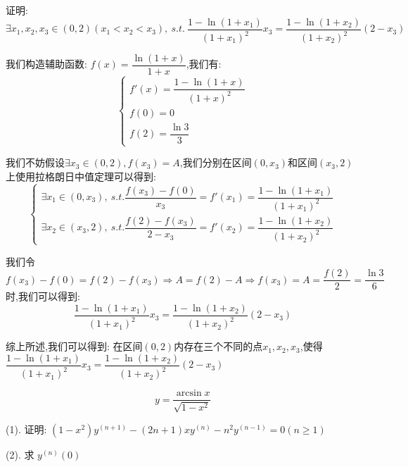\begin{example}[][Exam: 34.3.3]
	证明:
	$$\exists x_{1},x_{2},x_{3}\in(0,2)(x_{1} < x_{2} < x_{3}),\ s.t.\ 
	\dfrac{1-\ln(1+x_{1})}{(1+x_{1})^2}x_{3}=\dfrac{1-\ln(1+x_{2})}{(1+x_{2})^2}(2-x_{3})$$
\end{example}
\begin{solution}

	我们构造辅助函数:  $f(x)=\dfrac{\ln(1+x)}{1+x}$,我们有:  
	$$\left\lbrace 
	\begin{array}{l}
		f'(x)=\dfrac{1-\ln(1+x)}{(1+x)^2}\\
		f(0)=0\\
		f(2)=\dfrac{\ln 3}{3}
	\end{array}
	\right. $$
	
	我们不妨假设$\exists x_{3}\in(0,2), f(x_{3})=A$,我们分别在区间$(0,x_{3})$和区间$(x_{3},2)$上使用拉格朗日中值定理可以得到:  
	$$\left\lbrace 
	\begin{array}{l}
		\exists x_{1}\in(0,x_{3}),\ s.t. \dfrac{f(x_{3})-f(0)}{x_{3}}=f'(x_{1})=\dfrac{1-\ln(1+x_{1})}{(1+x_{1})^2}\\
		\exists x_{2}\in(x_{3},2),\ s.t. \dfrac{f(2)-f(x_{3})}{2-x_{3}}=f'(x_{2})=\dfrac{1-\ln(1+x_{2})}{(1+x_{2})^2}
	\end{array}
	\right. $$
	
	我们令$f(x_{3})-f(0)=f(2)-f(x_{3})\Rightarrow A=f(2)-A\Rightarrow f(x_{3})=A=\dfrac{f(2)}{2}=\dfrac{\ln 3}{6}$时,我们可以得到:  $$\dfrac{1-\ln(1+x_{1})}{(1+x_{1})^2}x_{3}=\dfrac{1-\ln(1+x_{2})}{(1+x_{2})^2}(2-x_{3})$$
	
	综上所述,我们可以得到:  在区间$(0,2)$内存在三个不同的点$x_{1},x_{2},x_{3}$,使得$\dfrac{1-\ln(1+x_{1})}{(1+x_{1})^2}x_{3}=\dfrac{1-\ln(1+x_{2})}{(1+x_{2})^2}(2-x_{3})$
\end{solution}

\begin{example}[][Exam: 34.3.4]
	$$y=\dfrac{\arcsin x}{\sqrt{1-x^2}}$$

(1). 证明: $(1-x^2)y^{(n+1)}-(2n+1)xy^{(n)}-n^2y^{(n-1)}=0(n\geq 1)$

(2). 求 $y^{(n)}(0)$
\end{example}

